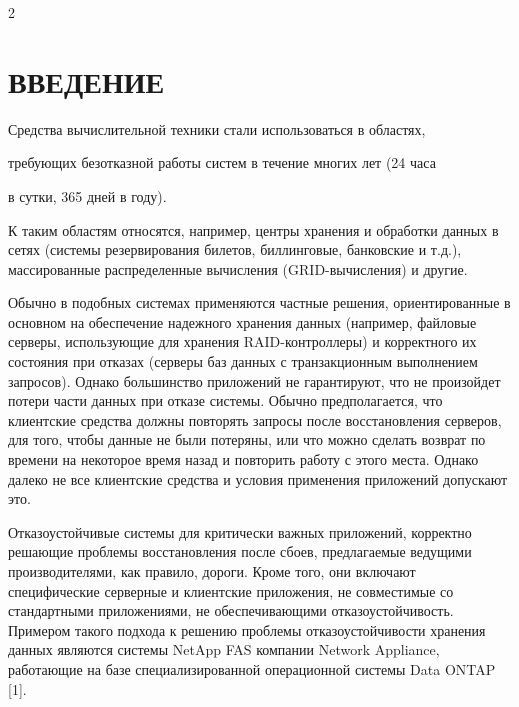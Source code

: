 \begin{multicols}{2}



\section*{ВВЕДЕНИЕ}



Средства вычислительной техники стали использоваться в областях,

требующих безотказной работы систем в течение многих лет (24 часа

в сутки, 365 дней в году).



\label{st\stat}







К таким областям относятся, например, центры хранения и обработки данных  в сетях (системы резервирования билетов, биллинговые,  банковские и т.д.), массированные распределенные вычисления (GRID-вычисления) и другие.



\thispagestyle{headings}



Обычно в подобных системах применяются частные решения, ориентированные в основном на обеспечение надежного хранения данных (например, файловые серверы, использующие для хранения RAID-контроллеры) и корректного их состояния при отказах (серверы баз данных с транзакционным выполнением запросов). Однако большинство приложений не гарантируют, что не произойдет потери части данных при отказе системы. Обычно предполагается, что клиентские средства должны повторять запросы после восстановления серверов, для того, чтобы данные не были потеряны, или что можно сделать возврат по времени на некоторое время назад и повторить работу с этого места. Однако далеко не все клиентские средства и условия применения приложений допускают это.



Отказоустойчивые системы для критически важных приложений, корректно решающие проблемы восстановления после сбоев,   предлагаемые ведущими производителями, как правило, дороги. Кроме того, они включают специфические серверные и клиентские приложения, не совместимые со стандартными приложениями, не обеспечивающими отказоустойчивость. Примером такого подхода к решению проблемы отказоустойчивости  хранения данных являются системы NetApp FAS компании Network Appliance, работающие на базе специализированной операционной системы Data ONTAP [1].




\end{multicols}
